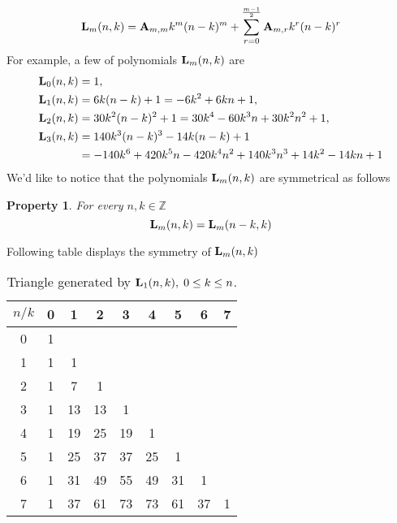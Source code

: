 \documentclass[12pt,letterpaper,oneside,reqno]{amsart}
\newcommand \coeffA [3][A] {{\mathbf{#1}} \sb{#2,#3}}
\newcommand \polynomialL [4][L]{{\mathbf{#1}}\sb{#2}(#3,#4)}
\newtheorem{ppty}[thm]{Property}
\numberwithin{equation}{section}
\begin{document}
    \begin{equation*}
        \polynomialL{m}{n}{k} = \coeffA{m}{m} k^m (n-k)^m + \sum_{r=0}^{\frac{m-1}{2}} \coeffA{m}{r} k^r (n-k)^r
    \end{equation*}
    For example, a few of polynomials $\polynomialL{m}{n}{k}$ are
    \begin{equation*}
        \begin{split}
            \polynomialL{0}{n}{k}
            &= 1, \\
            \polynomialL{1}{n}{k}
            &= 6 k (n-k) + 1
            = -6 k^2 + 6 k n + 1, \\
            \polynomialL{2}{n}{k}
            &=30 k^2 (n-k)^2+1
            =30 k^4-60 k^3 n+30 k^2 n^2+1, \\
            \polynomialL{3}{n}{k}
            &= 140 k^3 (n-k)^3-14 k (n-k)+1 \\
            &=-140 k^6+420 k^5 n-420 k^4 n^2+140 k^3 n^3+14 k^2-14 k n+1
        \end{split}
    \end{equation*}
    We'd like to notice that the polynomials $\polynomialL{m}{n}{k}$ are symmetrical as follows
    \begin{ppty}
        \label{ppty_symmetry_of_polynomial_l}
        For every $n,k\in\mathbb{Z}$
        \begin{equation*}
            \polynomialL{m}{n}{k} = \polynomialL{m}{n-k}{k}
        \end{equation*}
    \end{ppty}
    Following table displays the symmetry of $\polynomialL{m}{n}{k}$
    \begin{table}[H]
        \begin{tabular}{c|cccccccc}
            $n/k$ &0 &1 &2 &3 &4 &5 &6 &7 \\ [3px]
            \hline
            0 &1 & & & & & & & \\
            1 &1 &1 & & & & & & \\
            2 &1 &7 &1 & & & & & \\
            3 &1 &13 &13 &1 & & & & \\
            4 &1 &19 &25 &19 &1 & & & \\
            5 &1 &25 &37 &37 &25 &1 & & \\
            6 &1 &31 &49 &55 &49 &31 &1 & \\
            7 &1 &37 &61 &73 &73 &61 &37 &1
        \end{tabular}
        \caption{Triangle generated by $\polynomialL{1}{n}{k}, \; 0 \leq k \leq n$.}
        \label{fig_1}
    \end{table}
\end{document}
